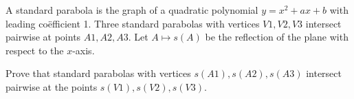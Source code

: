 A standard parabola is the graph of a quadratic polynomial \(y = x^2 + ax + b\) with leading co\"efficient 1. Three standard parabolas with vertices \(V1, V2, V3\) intersect pairwise at points \(A1, A2, A3\). Let \(A \mapsto s(A)\) be the reflection of the plane with respect to the \(x\)-axis.

Prove that standard parabolas with vertices \(s (A1), s (A2), s (A3)\) intersect pairwise at the points \(s (V1), s (V2), s (V3)\).
